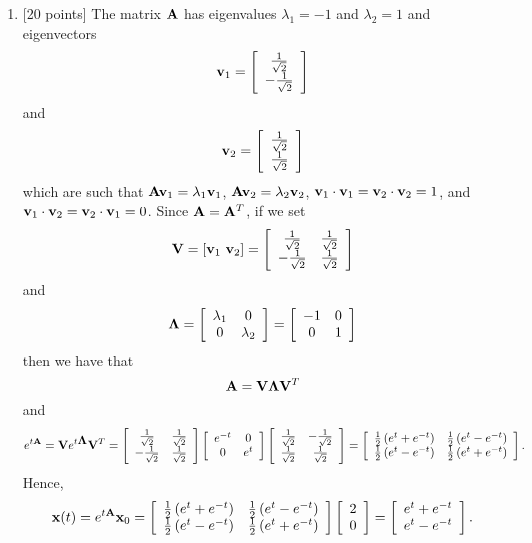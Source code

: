 \begin{solution}
\begin{enumerate}
\item {[20 points]} The matrix ${\bf A}$ has eigenvalues $\lambda_1 = -1$ and $\lambda_2 = 1$ and eigenvectors
\[
{\bf v}_1 = \left[\begin{array}{c}{1\over\sqrt{2}} \\ -{1\over\sqrt{2}}\end{array}\right]
\]
and
\[
{\bf v}_2 = \left[\begin{array}{c}{1\over\sqrt{2}} \\ {1\over\sqrt{2}}\end{array}\right]
\]
which are such that ${\bf A}{\bf v}_1=\lambda_1{\bf v}_1$, ${\bf A}{\bf v}_2=\lambda_2{\bf v}_2$, ${\bf v}_1\cdot{\bf v}_1={\bf v}_2\cdot{\bf v}_2=1$,  and ${\bf v}_1\cdot{\bf v}_2={\bf v}_2\cdot{\bf v}_1=0$. Since ${\bf A}={\bf A}^T$, if we set
\[
\BV = [\Bv_1\ \Bv_2]=\left[\begin{array}{cc}{1\over\sqrt{2}} & {1\over\sqrt{2}} \\ -{1\over\sqrt{2}} & {1\over\sqrt{2}}\end{array}\right]
\]
and
\[
\mbox{\boldmath$\Lambda$} = \left[\begin{array}{cc}\lambda_1 & 0 \\ 0 & \lambda_2\end{array}\right]=\left[\begin{array}{cc}-1 & 0 \\ 0 & 1\end{array}\right]
\]
then we have that
\[
{\bf A} = {\bf V}\mbox{\boldmath$\Lambda$}{\bf V}^T
\]
and
\[
e^{t{\bf A}} = {\bf V} e^{t\mbox{\boldmath$\Lambda$}} {\bf V}^T= \left[\begin{array}{cc}{1\over\sqrt{2}} & {1\over\sqrt{2}} \\ -{1\over\sqrt{2}} & {1\over\sqrt{2}}\end{array}\right] \left[\begin{array}{cc}e^{-t} & 0 \\ 0 & e^{t}\end{array}\right] \left[\begin{array}{cc}{1\over\sqrt{2}} & -{1\over\sqrt{2}} \\ {1\over\sqrt{2}} & {1\over\sqrt{2}}\end{array}\right]=\left[\begin{array}{cc}{1\over2}\left(e^t+e^{-t}\right) & {1\over2}\left(e^t - e^{-t}\right) \\ {1\over2}\left(e^t-e^{-t}\right) & {1\over2}\left(e^{t}+e^{-t}\right)\end{array}\right].
\]
Hence,
\[
{\bf x}(t) = e^{t{\bf A}} {\bf x}_0 = \left[\begin{array}{cc}{1\over2}\left(e^t+e^{-t}\right) & {1\over2}\left(e^t - e^{-t}\right) \\ {1\over2}\left(e^t-e^{-t}\right) & {1\over2}\left(e^{t}+e^{-t}\right)\end{array}\right]\left[\begin{array}{c}2 \\ 0\end{array}\right] = \left[\begin{array}{c}e^t+e^{-t} \\ e^t-e^{-t}\end{array}\right].
\]


\end{enumerate}
\end{solution}
